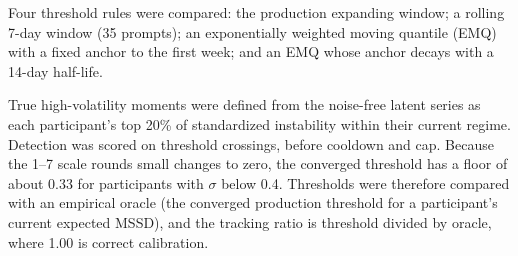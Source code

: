\documentclass[11pt,letterpaper]{article}
\begin{document}
Four threshold rules were compared: the production expanding window; a rolling 7-day window (35 prompts); an exponentially weighted moving quantile (EMQ) with a fixed anchor to the first week; and an EMQ whose anchor decays with a 14-day half-life.

True high-volatility moments were defined from the noise-free latent series as each participant's top 20\% of standardized instability within their current regime. Detection was scored on threshold crossings, before cooldown and cap. Because the 1--7 scale rounds small changes to zero, the converged threshold has a floor of about 0.33 for participants with $\sigma$ below 0.4. Thresholds were therefore compared with an empirical oracle (the converged production threshold for a participant's current expected MSSD), and the tracking ratio is threshold divided by oracle, where 1.00 is correct calibration.
\end{document}
